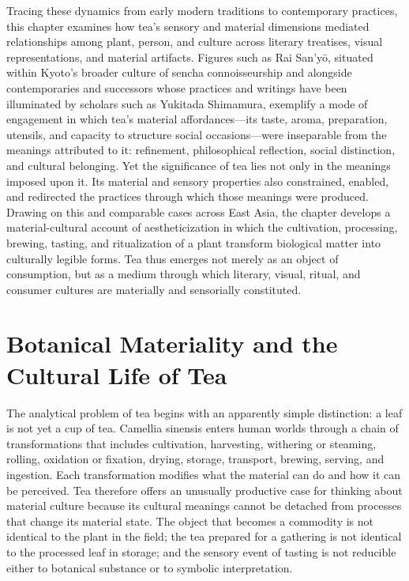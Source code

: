 \documentclass[11pt,a4paper]{article}
\begin{document}
Tracing these dynamics from early modern traditions to contemporary practices, this chapter examines how tea's sensory and material dimensions mediated relationships among plant, person, and culture across literary treatises, visual representations, and material artifacts. Figures such as Rai San'yō, situated within Kyoto's broader culture of sencha connoisseurship and alongside contemporaries and successors whose practices and writings have been illuminated by scholars such as Yukitada Shimamura, exemplify a mode of engagement in which tea's material affordances---its taste, aroma, preparation, utensils, and capacity to structure social occasions---were inseparable from the meanings attributed to it: refinement, philosophical reflection, social distinction, and cultural belonging. Yet the significance of tea lies not only in the meanings imposed upon it. Its material and sensory properties also constrained, enabled, and redirected the practices through which those meanings were produced. Drawing on this and comparable cases across East Asia, the chapter develops a material-cultural account of aestheticization in which the cultivation, processing, brewing, tasting, and ritualization of a plant transform biological matter into culturally legible forms. Tea thus emerges not merely as an object of consumption, but as a medium through which literary, visual, ritual, and consumer cultures are materially and sensorially constituted.

\section{Botanical Materiality and the Cultural Life of Tea}

The analytical problem of tea begins with an apparently simple distinction: a leaf is not yet a cup of tea. Camellia sinensis enters human worlds through a chain of transformations that includes cultivation, harvesting, withering or steaming, rolling, oxidation or fixation, drying, storage, transport, brewing, serving, and ingestion. Each transformation modifies what the material can do and how it can be perceived. Tea therefore offers an unusually productive case for thinking about material culture because its cultural meanings cannot be detached from processes that change its material state. The object that becomes a commodity is not identical to the plant in the field; the tea prepared for a gathering is not identical to the processed leaf in storage; and the sensory event of tasting is not reducible either to botanical substance or to symbolic interpretation.
\end{document}
